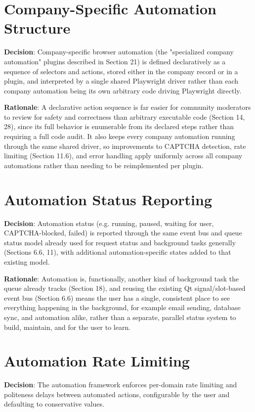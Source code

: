 \section{Company-Specific Automation Structure}
\textbf{Decision}: Company-specific browser automation (the "specialized company automation" plugins described in Section 21) is defined declaratively as a sequence of selectors and actions, stored either in the company record or in a plugin, and interpreted by a single shared Playwright driver rather than each company automation being its own arbitrary code driving Playwright directly.

\textbf{Rationale}: A declarative action sequence is far easier for community moderators to review for safety and correctness than arbitrary executable code (Section 14, 28), since its full behavior is enumerable from its declared steps rather than requiring a full code audit. It also keeps every company automation running through the same shared driver, so improvements to CAPTCHA detection, rate limiting (Section 11.6), and error handling apply uniformly across all company automations rather than needing to be reimplemented per plugin.
\section{Automation Status Reporting}
\textbf{Decision}: Automation status (e.g. running, paused, waiting for user, CAPTCHA-blocked, failed) is reported through the same event bus and queue status model already used for request status and background tasks generally (Sections 6.6, 11), with additional automation-specific states added to that existing model.

\textbf{Rationale}: Automation is, functionally, another kind of background task the queue already tracks (Section 18), and reusing the existing Qt signal/slot-based event bus (Section 6.6) means the user has a single, consistent place to see everything happening in the background, for example email sending, database sync, and automation alike, rather than a separate, parallel status system to build, maintain, and for the user to learn.
\section{Automation Rate Limiting}
\textbf{Decision}: The automation framework enforces per-domain rate limiting and politeness delays between automated actions, configurable by the user and defaulting to conservative values.

